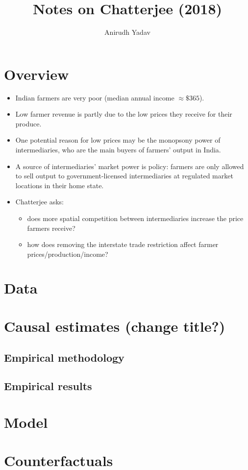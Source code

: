 \documentclass[12pt]{article}
\title{Notes on Chatterjee (2018)}
\author{Anirudh Yadav}
\begin{document}
\maketitle

\section{Overview}
\begin{itemize}
\item Indian farmers are very poor (median annual income $\approx \$365$).
\item Low farmer revenue is partly due to the low prices they receive for their produce.
\item One potential reason for low prices may be the monopsony power of intermediaries, who are the main buyers of farmers' output in India.
\item A source of intermediaries' market power is policy: farmers are only allowed to sell output to government-licensed intermediaries at regulated market locations in their home state.
\item Chatterjee asks: 
\begin{itemize}
\item does more spatial competition between intermediaries increase the price farmers receive?
\item how does removing the interstate trade restriction affect farmer prices/production/income?
\end{itemize}
\end{itemize}

\section{Data}

\section{Causal estimates (change title?)}

\subsection{Empirical methodology}
\subsection{Empirical results}

\section{Model}

\section{Counterfactuals}
\end{document}
